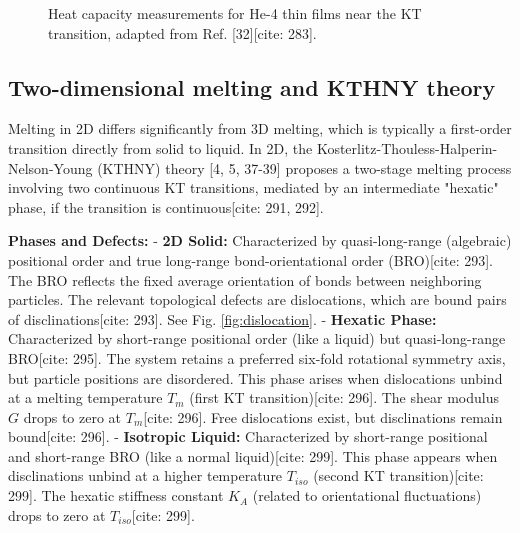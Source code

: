 \documentclass[11pt]{article}
\begin{document}
\begin{figure}[h!]
    \centering
    \caption{Heat capacity measurements for He-4 thin films near the KT transition, adapted from Ref. [32][cite: 283].}
    \label{fig:he4_cv}
\end{figure}

\subsection{Two-dimensional melting and KTHNY theory}

Melting in 2D differs significantly from 3D melting, which is typically a first-order transition directly from solid to liquid. In 2D, the Kosterlitz-Thouless-Halperin-Nelson-Young (KTHNY) theory [4, 5, 37-39] proposes a two-stage melting process involving two continuous KT transitions, mediated by an intermediate "hexatic" phase, if the transition is continuous[cite: 291, 292].

\textbf{Phases and Defects:}
- \textbf{2D Solid:} Characterized by quasi-long-range (algebraic) positional order and true long-range bond-orientational order (BRO)[cite: 293]. The BRO reflects the fixed average orientation of bonds between neighboring particles. The relevant topological defects are dislocations, which are bound pairs of disclinations[cite: 293]. See Fig. \ref{fig:dislocation}.
- \textbf{Hexatic Phase:} Characterized by short-range positional order (like a liquid) but quasi-long-range BRO[cite: 295]. The system retains a preferred six-fold rotational symmetry axis, but particle positions are disordered. This phase arises when dislocations unbind at a melting temperature $T_m$ (first KT transition)[cite: 296]. The shear modulus $G$ drops to zero at $T_m$[cite: 296]. Free dislocations exist, but disclinations remain bound[cite: 296].
- \textbf{Isotropic Liquid:} Characterized by short-range positional and short-range BRO (like a normal liquid)[cite: 299]. This phase appears when disclinations unbind at a higher temperature $T_{iso}$ (second KT transition)[cite: 299]. The hexatic stiffness constant $K_A$ (related to orientational fluctuations) drops to zero at $T_{iso}$[cite: 299].
\end{document}

